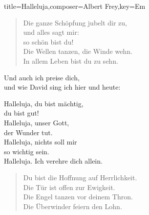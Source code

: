 \documentclass[]{leadsheet}
\begin{document}
\begin{song}{title={Halleluja},composer={Albert Frey},key={Em}}

\begin{verse}
Die ganze Schöpfung jubelt dir zu, \\
und alles sagt mir: \\
so schön bist du! \\
Die Wellen tanzen, die Winde wehn. \\
In allem Leben bist du zu sehn. \\
\end{verse}

\begin{prechorus}
Und auch ich preise dich, \\
und wie David sing ich hier und heute: \\
\end{prechorus}

\begin{chorus}
Halleluja, du bist mächtig, \\
du bist gut! \\
Halleluja, unser Gott, \\
der Wunder tut. \\
Halleluja, nichts soll mir \\
so wichtig sein. \\
Halleluja. Ich verehre dich allein. \\
\end{chorus}

\begin{verse}
Du bist die Hoffnung auf Herrlichkeit. \\
Die Tür ist offen zur Ewigkeit. \\
Die Engel tanzen vor deinem Thron. \\
Die Überwinder feiern den Lohn. \\
\end{verse}

\end{song}
\end{document}
